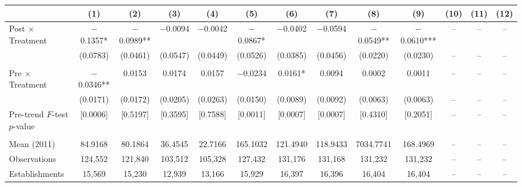 \documentclass[12pt,letterpaper]{article}
\begin{document}
\begin{table}[]
\begin{threeparttable}
\begin{tabular}{lcccccccccccc}
 & (1) & (2) & (3) & (4) & (5) & (6) & (7) & (8) & (9) & (10) & (11) & (12) \\
\midrule
Post $\times$ Treatment & $-$0.1357* & $-$0.0989** & $-$0.0094 & $-$0.0042 & $-$0.0867* & $-$0.0402 & $-$0.0594 & $-$0.0549** & $-$0.0610*** & -- & -- & -- \\
  & (0.0783) & (0.0461) & (0.0547) & (0.0449) & (0.0526) & (0.0385) & (0.0456) & (0.0220) & (0.0230) & -- & -- & -- \\
  &  &  &  &  &  &  &  &  &  &  &  & \\
Pre $\times$ Treatment & $-$0.0346** & 0.0153 & 0.0174 & 0.0157 & $-$0.0234 & 0.0161* & 0.0094 & 0.0002 & 0.0011 & -- & -- & -- \\
  & (0.0171) & (0.0172) & (0.0205) & (0.0263) & (0.0150) & (0.0089) & (0.0092) & (0.0063) & (0.0063) & -- & -- & -- \\
Pre-trend $F$-test $p$-value & [0.0006] & [0.5197] & [0.3595] & [0.7588] & [0.0011] & [0.0007] & [0.0007] & [0.4310] & [0.2051] & -- & -- & -- \\
  &  &  &  &  &  &  &  &  &  &  &  & \\
Mean (2011) & 84.9168 & 80.1864 & 36.4545 & 22.7166 & 165.1032 & 121.4940 & 118.9433 & 7034.7741 & 168.4969 & -- & -- & -- \\
Observations & 124{,}552 & 121{,}840 & 103{,}512 & 105{,}328 & 127{,}432 & 131{,}176 & 131{,}168 & 131{,}232 & 131{,}232 & -- & -- & -- \\
Establishments & 15{,}569 & 15{,}230 & 12{,}939 & 13{,}166 & 15{,}929 & 16{,}397 & 16{,}396 & 16{,}404 & 16{,}404 & -- & -- & -- \\
\bottomrule
\end{tabular}
\scriptsize
\begin{tablenotes}

\end{tablenotes}
\end{threeparttable}
\end{table}
\end{document}
